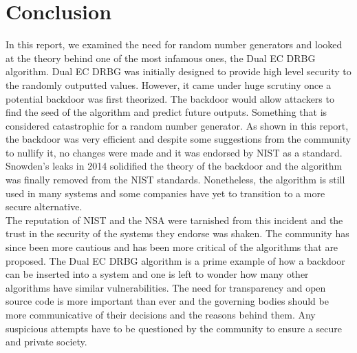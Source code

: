 \section{Conclusion}

In this report, we examined the need for random number generators and looked at the theory behind one of the most infamous ones, the Dual EC DRBG algorithm. Dual EC DRBG was initially designed to provide high level security to the randomly outputted values. However, it came under huge scrutiny once a potential backdoor was first theorized. The backdoor would allow attackers to find the seed of the algorithm and predict future outputs. Something that is considered catastrophic for a random number generator. As shown in this report, the backdoor was very efficient and despite some suggestions from the community to nullify it, no changes were made and it was endorsed by NIST as a standard. Snowden's leaks in 2014 solidified the theory of the backdoor and the algorithm was finally removed from the NIST standards. Nonetheless, the algorithm is still used in many systems and some companies have yet to transition to a more secure alternative.
\\

The reputation of NIST and the NSA were tarnished from this incident and the trust in the security of the systems they endorse was shaken. The community has since been more cautious and has been more critical of the algorithms that are proposed. The Dual EC DRBG algorithm is a prime example of how a backdoor can be inserted into a system and one is left to wonder how many other algorithms have similar vulnerabilities. The need for transparency and open source code is more important than ever and the governing bodies should be more communicative of their decisions and the reasons behind them. Any suspicious attempts have to be questioned by the community to ensure a secure and private society.